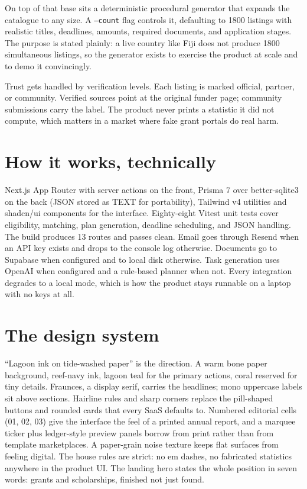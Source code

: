 \documentclass[11pt]{article}
\begin{document}
On top of that base sits a deterministic procedural generator that expands the catalogue to any size. A \texttt{--count} flag controls it, defaulting to 1800 listings with realistic titles, deadlines, amounts, required documents, and application stages. The purpose is stated plainly: a live country like Fiji does not produce 1800 simultaneous listings, so the generator exists to exercise the product at scale and to demo it convincingly.

Trust gets handled by verification levels. Each listing is marked official, partner, or community. Verified sources point at the original funder page; community submissions carry the label. The product never prints a statistic it did not compute, which matters in a market where fake grant portals do real harm.

\section{How it works, technically}

Next.js App Router with server actions on the front, Prisma 7 over better-sqlite3 on the back (JSON stored as TEXT for portability), Tailwind v4 utilities and shadcn/ui components for the interface. Eighty-eight Vitest unit tests cover eligibility, matching, plan generation, deadline scheduling, and JSON handling. The build produces 13 routes and passes clean. Email goes through Resend when an API key exists and drops to the console log otherwise. Documents go to Supabase when configured and to local disk otherwise. Task generation uses OpenAI when configured and a rule-based planner when not. Every integration degrades to a local mode, which is how the product stays runnable on a laptop with no keys at all.

\section{The design system}

``Lagoon ink on tide-washed paper'' is the direction. A warm bone paper background, reef-navy ink, lagoon teal for the primary actions, coral reserved for tiny details. Fraunces, a display serif, carries the headlines; mono uppercase labels sit above sections. Hairline rules and sharp corners replace the pill-shaped buttons and rounded cards that every SaaS defaults to. Numbered editorial cells (01, 02, 03) give the interface the feel of a printed annual report, and a marquee ticker plus ledger-style preview panels borrow from print rather than from template marketplaces. A paper-grain noise texture keeps flat surfaces from feeling digital. The house rules are strict: no em dashes, no fabricated statistics anywhere in the product UI. The landing hero states the whole position in seven words: grants and scholarships, finished not just found.
\end{document}
